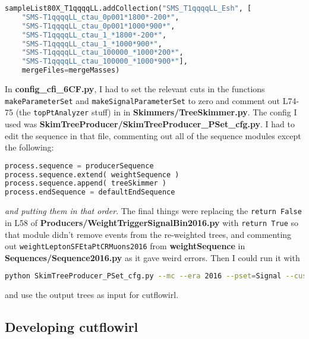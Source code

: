\begin{lstlisting}[belowskip=-0.7cm, language=python, numbers=none]
sampleList80X_T1qqqqLL.addCollection("SMS_T1qqqqLL_Esh", [
    "SMS-T1qqqqLL_ctau_0p001*1800*-200*",
    "SMS-T1qqqqLL_ctau_0p001*1000*900*",
    "SMS-T1qqqqLL_ctau_1_*1800*-200*",
    "SMS-T1qqqqLL_ctau_1_*1000*900*",
    "SMS-T1qqqqLL_ctau_100000_*1000*200*",
    "SMS-T1qqqqLL_ctau_100000_*1000*900*"],
    mergeFiles=mergeMasses) 
\end{lstlisting}

In \textbf{config\_cfi\_6CF.py}, I had to set the relevant cuts in the functions \texttt{makeParameterSet} and \texttt{makeSignalParameterSet} to zero and comment out L74-75 (the \texttt{topPtAnalyzer} stuff) in in \textbf{Skimmers/TreeSkimmer.py}. The config I used was \textbf{SkimTreeProducer/SkimTreeProducer\_PSet\_cfg.py}. I had to edit the sequence in that file, commenting out all of the sequence modules except the following:

\begin{lstlisting}[belowskip=-0.7cm, language=python, numbers=none]
process.sequence = producerSequence
process.sequence.extend( weightSequence )
process.sequence.append( treeSkimmer )
process.endSequence = defaultEndSequence
\end{lstlisting}

\emph{and putting them in that order}. The final things were replacing the \texttt{return False} in L58 of \textbf{Producers/WeightTriggerSignalBin2016.py} with \texttt{return True} so that module didn't remove events from the re-weighted trees, and commenting out \texttt{weightLeptonSFEtaPtCRMuons2016} from \textbf{weightSequence} in \textbf{Sequences/Sequence2016.py} as it gave weird errors. Then I could run it with

\begin{lstlisting}[belowskip=-0.7cm, language=sh, numbers=none]
python SkimTreeProducer_PSet_cfg.py --mc --era 2016 --pset=Signal --customSamples SMS_T1qqqqLL_Esh --outDir <blah>
\end{lstlisting}

and use the output trees as input for cutflowirl.

\subsection{Developing cutflowirl}

